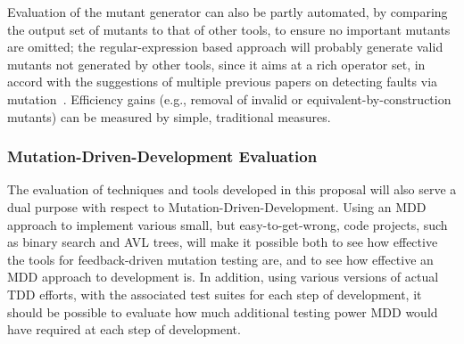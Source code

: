 Evaluation of the mutant generator can also be partly automated, by
comparing the output set of mutants to that of other tools, to ensure
no important mutants are omitted; the regular-expression based
approach will probably generate valid mutants not generated by other
tools, since it aims at a rich operator set, in accord with the
suggestions of multiple previous papers on detecting faults via
mutation~\cite{just2014mutants,gopinath2017mutation}.  Efficiency
gains (e.g., removal of invalid or equivalent-by-construction mutants) can
be measured by simple, traditional measures.

\subsubsection{Mutation-Driven-Development Evaluation}
\label{sec:mevalplan}

The evaluation of techniques and tools developed in this proposal will
also serve a dual purpose with respect to
Mutation-Driven-Development.  Using an MDD approach to implement
various small, but easy-to-get-wrong, code projects, such as binary
search and AVL trees, will make it possible both to see how effective
the tools for feedback-driven mutation testing are, and to see how effective an MDD approach to development is.  In
addition, using various versions of actual TDD efforts, with the
associated test suites for each step of development, it should be
possible to evaluate how much additional testing power MDD would have
required at each step of development.